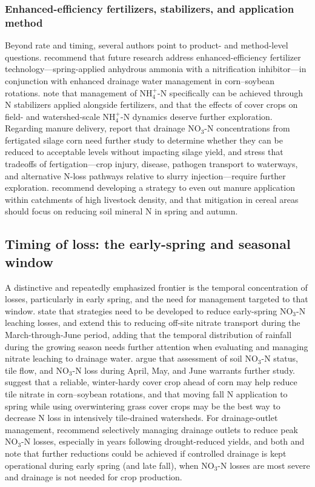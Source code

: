 \subsubsection{Enhanced-efficiency fertilizers, stabilizers, and application method}
Beyond rate and timing, several authors point to product- and method-level questions. \textcite{Kaur2024c} recommend that future research address enhanced-efficiency fertilizer technology---spring-applied anhydrous ammonia with a nitrification inhibitor---in conjunction with enhanced drainage water management in corn--soybean rotations. \textcite{Vincent2025} note that management of NH$_4^+$-N specifically can be achieved through N stabilizers applied alongside fertilizers, and that the effects of cover crops on field- and watershed-scale NH$_4^+$-N dynamics deserve further exploration. Regarding manure delivery, \textcite{Gamble2018} report that drainage NO$_3$-N concentrations from fertigated silage corn need further study to determine whether they can be reduced to acceptable levels without impacting silage yield, and stress that tradeoffs of fertigation---crop injury, disease, pathogen transport to waterways, and alternative N-loss pathways relative to slurry injection---require further exploration. \textcite{Bechmann2014} recommend developing a strategy to even out manure application within catchments of high livestock density, and that mitigation in cereal areas should focus on reducing soil mineral N in spring and autumn.

\subsection{Timing of loss: the early-spring and seasonal window}
A distinctive and repeatedly emphasized frontier is the temporal concentration of losses, particularly in early spring, and the need for management targeted to that window. \textcite{Bakhsh2007} state that strategies need to be developed to reduce early-spring NO$_3$-N leaching losses, and \textcite{Bakhsh2010} extend this to reducing off-site nitrate transport during the March-through-June period, adding that the temporal distribution of rainfall during the growing season needs further attention when evaluating and managing nitrate leaching to drainage water. \textcite{Nance2007} argue that assessment of soil NO$_3$-N status, tile flow, and NO$_3$-N loss during April, May, and June warrants further study. \textcite{Gentry2024} suggest that a reliable, winter-hardy cover crop ahead of corn may help reduce tile nitrate in corn--soybean rotations, and that moving fall N application to spring while using overwintering grass cover crops may be the best way to decrease N loss in intensively tile-drained watersheds. For drainage-outlet management, \textcite{Skaggs1995} recommend selectively managing drainage outlets to reduce peak NO$_3$-N losses, especially in years following drought-reduced yields, and both \textcite{Elmi2004} and \textcite{Elmi2002} note that further reductions could be achieved if controlled drainage is kept operational during early spring (and late fall), when NO$_3$-N losses are most severe and drainage is not needed for crop production.

